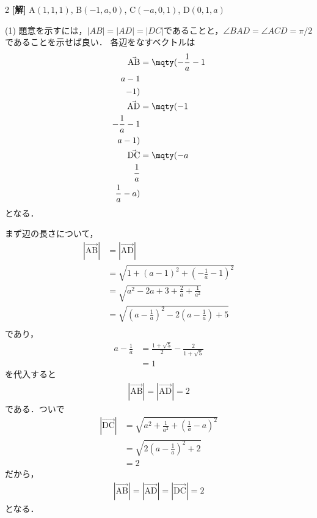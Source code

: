 \documentclass[../../../../main.tex]{subfiles}
\begin{document}
\setcounter{equation}{0}
\begin{oframed}
  
\end{oframed}
\setlength{\columnseprule}{0.4pt}
\begin{multicols}{2}
  {\bf[解]}
  A$(1,1,1)$, B$(-1,a,0)$, C$(-a,0,1)$, D$(0,1,a)$

  (1)
  題意を示すには，$|AB|=|AD|=|DC|$であることと，$\angle BAD = \angle ACD = \pi/2$であることを示せば良い．
  各辺をなすベクトルは
  \begin{align*}
    \vec{\text{AB}} & = \mqty( -\frac{1}{a}-1 \\ a-1 \\ -1) \\
    \vec{\text{AD}} & = \mqty( -1             \\ -\frac{1}{a}-1 \\ a-1 ) \\
    \vec{\text{DC}} & = \mqty(-a              \\ \frac{1}{a} \\ \frac{1}{a}-a )
  \end{align*}
  となる．

  まず辺の長さについて，
  \begin{align*}
    |\vec{\text{AB}}|
     & = |\vec{\text{AD}}|                                                   \\
     & = \sqrt{1+(a-1)^2+\left(-\frac{1}{a}-1\right)^2}                      \\
     & = \sqrt{a^2 -2a + 3 + \frac{2}{a} + \frac{1}{a^2}}                    \\
     & = \sqrt{\left(a-\frac{1}{a}\right)^2 - 2\left(a-\frac{1}{a}\right)+5} \\
  \end{align*}
  であり，
  \begin{align}
    a-\frac{1}{a}
     & = \frac{1+\sqrt{5}}{2} - \frac{2}{1+\sqrt{5}} \\
     & = 1 \label{1992-6:eq:1}
  \end{align}
  を代入すると
  \begin{align*}
    |\vec{\text{AB}}| = |\vec{\text{AD}}|   = 2
  \end{align*}
  である．ついで
  \begin{align*}
    |\vec{\text{DC}}|
     & = \sqrt{a^2+\frac{1}{a^2}+\left(\frac{1}{a}-a\right)^2} \\
     & = \sqrt{2\left(a-\frac{1}{a}\right)^2+2}                \\
     & = 2
  \end{align*}
  だから，
  \begin{align*}
    |\vec{\text{AB}}| = |\vec{\text{AD}}| =|\vec{\text{DC}}| = 2
  \end{align*}
  となる．


\end{multicols}
\end{document}
